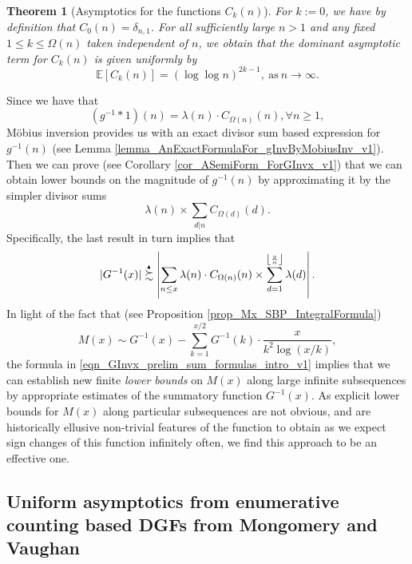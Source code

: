 \documentclass[11pt,reqno,a4letter]{article}
\numberwithin{figure}{section}
\numberwithin{table}{section}
\newcommand{\Floor}[2]{\ensuremath{\left\lfloor \frac{#1}{#2} \right\rfloor}}
\theoremstyle{plain}
\newtheorem{theorem}{Theorem}
\numberwithin{theorem}{section}
\theoremstyle{definition}
\newcommand{\SuccSim}[0]{\overset{_{\scriptsize{\blacktriangle}}}{\succsim}}
\begin{document}
\begin{theorem}[Asymptotics for the functions $C_k(n)$] 
\label{theorem_Ckn_GeneralAsymptoticsForms} 
For $k := 0$, we have by definition that $C_0(n) = \delta_{n,1}$. 
For all sufficiently large $n > 1$ and any fixed $1 \leq k \leq \Omega(n)$ 
taken independent of $n$, 
we obtain that the dominant asymptotic term for $C_k(n)$ is given uniformly by 
\[
\mathbb{E}[C_k(n)] = (\log\log n)^{2k-1}, \mathrm{\ as\ }n \rightarrow \infty. 
\]
\end{theorem} 

Since we have that 
\begin{equation} 
\label{eqn_AnExactFormulaFor_gInvByMobiusInv_v1} 
(g^{-1} \ast 1)(n) = \lambda(n) \cdot C_{\Omega(n)}(n), \forall n \geq 1, 
\end{equation} 
M\"{o}bius inversion provides us with an exact divisor sum based expression for $g^{-1}(n)$ 
(see Lemma \ref{lemma_AnExactFormulaFor_gInvByMobiusInv_v1}). 
Then we can prove (see Corollary \ref{cor_ASemiForm_ForGInvx_v1}) that we can obtain lower bounds on 
the magnitude of $g^{-1}(n)$ by approximating it by the simpler divisor sums 
\[
\lambda(n) \times \sum_{d|n} C_{\Omega(d)}(d). 
\]
Specifically, the last result in turn implies that 
\begin{equation} 
\label{eqn_GInvx_prelim_sum_formulas_intro_v1} 
|G^{-1}(x)| \SuccSim \left\lvert 
     \sum_{n \leq x} \lambda(n) \cdot C_{\Omega(n)}(n) \times 
     \sum_{d=1}^{\Floor{x}{n}} \lambda(d) \right\rvert. 
\end{equation} 
In light of the fact that (see Proposition \ref{prop_Mx_SBP_IntegralFormula}) 
\[
M(x) \sim G^{-1}(x) - \sum_{k=1}^{x/2} G^{-1}(k) \cdot \frac{x}{k^2 \log(x/k)}, 
\]
the formula in \eqref{eqn_GInvx_prelim_sum_formulas_intro_v1} implies that we can establish 
new finite \emph{lower bounds} on $M(x)$ along large infinite subsequences 
by appropriate estimates of the summatory function $G^{-1}(x)$. 
As explicit lower bounds for $M(x)$ along particular subsequences are not obvious, and are 
historically ellusive non-trivial features of the function to obtain as 
we expect sign changes of this function infinitely often, we find this approach to be an effective one. 

\subsection{Uniform asymptotics from enumerative counting based DGFs from Mongomery and Vaughan} 
\end{document}

